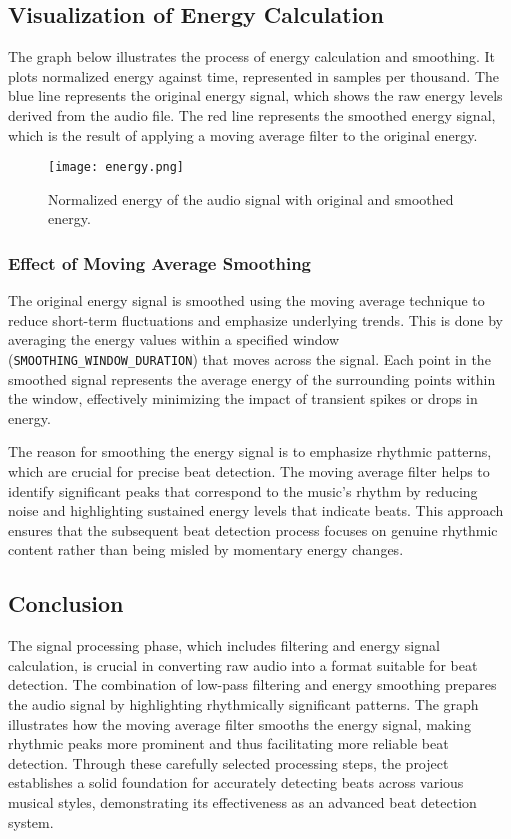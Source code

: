 \subsection{Visualization of Energy Calculation}

The graph below illustrates the process of energy calculation and smoothing. It plots normalized energy against time, represented in samples per thousand. The blue line represents the original energy signal, which shows the raw energy levels derived from the audio file. The red line represents the smoothed energy signal, which is the result of applying a moving average filter to the original energy.

\begin{figure}[H]
    \centering
    \texttt{[image: energy.png]}
    \caption{Normalized energy of the audio signal with original and smoothed energy.}
\end{figure}

\subsubsection{Effect of Moving Average Smoothing}

The original energy signal is smoothed using the moving average technique to reduce short-term fluctuations and emphasize underlying trends. This is done by averaging the energy values within a specified window (\texttt{SMOOTHING\_WINDOW\_DURATION}) that moves across the signal. Each point in the smoothed signal represents the average energy of the surrounding points within the window, effectively minimizing the impact of transient spikes or drops in energy.

The reason for smoothing the energy signal is to emphasize rhythmic patterns, which are crucial for precise beat detection. The moving average filter helps to identify significant peaks that correspond to the music's rhythm by reducing noise and highlighting sustained energy levels that indicate beats. This approach ensures that the subsequent beat detection process focuses on genuine rhythmic content rather than being misled by momentary energy changes.

\subsection{Conclusion}

The signal processing phase, which includes filtering and energy signal calculation, is crucial in converting raw audio into a format suitable for beat detection. The combination of low-pass filtering and energy smoothing prepares the audio signal by highlighting rhythmically significant patterns. The graph illustrates how the moving average filter smooths the energy signal, making rhythmic peaks more prominent and thus facilitating more reliable beat detection. Through these carefully selected processing steps, the project establishes a solid foundation for accurately detecting beats across various musical styles, demonstrating its effectiveness as an advanced beat detection system.
